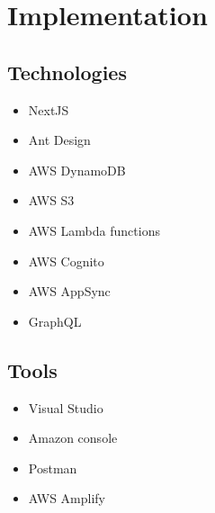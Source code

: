 %
%
\chapter{Implementation}%
%
\label{chapter:implementation}

\section{Technologies} 

\begin{itemize}
  \item NextJS
  \item Ant Design
  \item AWS DynamoDB
  \item AWS S3
  \item AWS Lambda functions
  \item AWS Cognito
  \item AWS AppSync
  \item GraphQL
\end{itemize}

\section{Tools} 

\begin{itemize}
  \item Visual Studio
  \item Amazon console
  \item Postman
  \item AWS Amplify
\end{itemize}